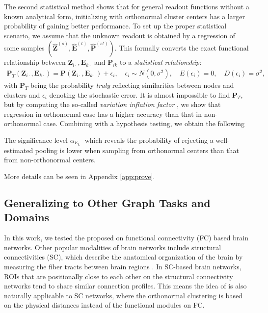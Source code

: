 The second statistical method shows that for general readout functions without a known analytical form, initializing with orthonormal cluster centers has a larger probability of gaining better performance. To set up the proper statistical scenario, we assume that the unknown readout is obtained by a regression of some samples $(\hat{\bm Z}^{(s)}, \hat{\bm E}^{(t)}, \hat{\bm P}^{(st)})$. This formally converts the exact functional relationship between $\bm Z_{i\cdot}, \bm E_{k\cdot}$ and $\bm P_{ik}$ to a \emph{statistical relationship}:
\begin{align}
	\bm P_T(\bm Z_{i\cdot}, \bm E_{k\cdot}) = \bm P(\bm Z_{i\cdot}, \bm E_{k\cdot}) + \epsilon_i, \quad \epsilon_i \sim N(0,\sigma^2), \quad  E(\epsilon_i) = 0,  \quad  D(\epsilon_i) = \sigma^2, 
\end{align}
with $\bm P_T$ being the probability \emph{truly} reflecting similarities between nodes and clusters and $\epsilon_i$ denoting the stochastic error. It is almost impossible to find $\bm P_T$, but by computing the so-called \emph{variation inflation factor} \cite{Kutner1985}, we show that regression in orthonormal case has a higher accuracy than that in non-orthonormal case. Combining with a hypothesis testing, we obtain the following 
\begin{theorem} \label{Thm3.2}
	The significance level $\alpha_{E_{k\cdot}}$ which reveals the probability of rejecting a well-estimated pooling is lower when sampling from orthonormal centers than that from non-orthonormal centers.
\end{theorem}
More details can be seen in Appendix \ref{app:prove}.

\subsection{Generalizing \poolingshort to Other Graph Tasks and Domains}

In this work, we tested the proposed \poolingshort on functional connectivity (FC) based brain networks. Other popular modalities of brain networks include structural connectivities (SC), which describe the anatomical organization of the brain by measuring the fiber tracts between brain regions \citep{10.3389/fnhum.2021.721206}. In SC-based brain networks, ROIs that are positionally close to each other on the structural connectivity networks tend to share similar connection profiles. This means the idea of \poolingshort is also naturally applicable to SC networks, where the orthonormal clustering is based on the physical distances instead of the functional modules on FC. 

